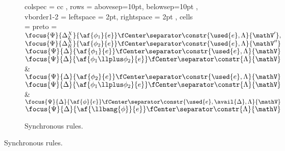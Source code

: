 \begin{figure}[h!]
	\ContinuedFloat
	\begin{subfigure}{\textwidth}
		\centering
		\begin{tblr}{ colspec = { cc } 
			    , rows = {abovesep=10pt, belowsep=10pt}
			    , vborder{1-2} = { leftspace = 2pt, rightspace = 2pt } 
			    , cells = { preto = {\footnotesize} }
			    }
			\AX$\focus{\Psi}{\Delta_L^X}{\af{\phi_1}{e}} \fCenter \separator \constr{\used{e}, \Lambda}{\mathV'},$
			\noLine
			\UI$\focus{\Psi}{\Delta_R^X}{\af{\phi_2}{e}} \fCenter \separator \constr{\used{e}, \Lambda}{\mathV''}$
			\LeftLabel{\derRule{\displayten}}
			\DP
			\\ 
			\AX$\focus{\Psi}{\Delta}{\af{\phi_1}{e}} \fCenter \separator \constr{\used{e}, \Lambda}{\mathV}$
			\LeftLabel{\derRule{\displayplus[L]}}
			\UI$\focus{\Psi}{\Delta}{\af{\phi_1 \llplus \phi_2}{e}} \fCenter \separator \constr{\Lambda}{\mathV}$
			\DP
			&
			\AX$\focus{\Psi}{\Delta}{\af{\phi_2}{e}} \fCenter \separator \constr{\used{e}, \Lambda}{\mathV}$
			\LeftLabel{\derRule{\displayplus[R]}}
			\UI$\focus{\Psi}{\Delta}{\af{\phi_1 \llplus \phi_2}{e}} \fCenter \separator \constr{\Lambda}{\mathV}$
			\DP
			\\
			\LeftLabel{\derRule{\displayone}}
			\DP
			&
			\AX$\focus{\Psi}{\Delta}{\af{\phi}{e}} \fCenter \separator \constr{\used{e}, \avail{\Delta}, \Lambda }{\mathV}$
			\LeftLabel{\derRule{\displaybang}}
			\UI$\focus{\Psi}{\Delta}{\af{\llbang{\phi}}{e}} \fCenter \separator \constr{\Lambda}{\mathV}$
			\DP
			\\
			\LeftLabel{\derRule{\displaytoasy}}
			\DP
		\end{tblr}
		\caption{Synchronous rules.}
	\end{subfigure}
\end{figure}
